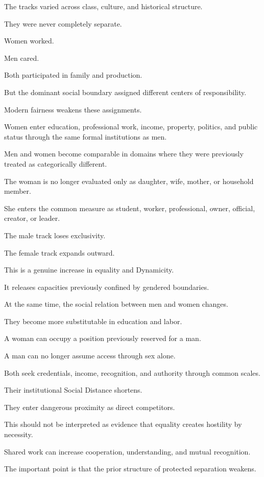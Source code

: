 The tracks varied across class, culture, and historical structure.

They were never completely separate.

Women worked.

Men cared.

Both participated in family and production.

But the dominant social boundary assigned different centers of responsibility.

Modern fairness weakens these assignments.

Women enter education, professional work, income, property, politics, and public status through the same formal institutions as men.

Men and women become comparable in domains where they were previously treated as categorically different.

The woman is no longer evaluated only as daughter, wife, mother, or household member.

She enters the common measure as student, worker, professional, owner, official, creator, or leader.

The male track loses exclusivity.

The female track expands outward.

This is a genuine increase in equality and Dynamicity.

It releases capacities previously confined by gendered boundaries.

At the same time, the social relation between men and women changes.

They become more substitutable in education and labor.

A woman can occupy a position previously reserved for a man.

A man can no longer assume access through sex alone.

Both seek credentials, income, recognition, and authority through common scales.

Their institutional Social Distance shortens.

They enter dangerous proximity as direct competitors.

This should not be interpreted as evidence that equality creates hostility by necessity.

Shared work can increase cooperation, understanding, and mutual recognition.

The important point is that the prior structure of protected separation weakens.

